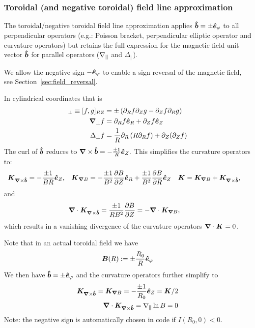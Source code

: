 \subsubsection{Toroidal (and negative toroidal) field line approximation}\label{sec:torfieldlineapprox}
The toroidal/negative toroidal field line approximation applies \(\bm{\hat{b}}= \pm \bm{\hat{e}}_\varphi\) to all perpendicular operators
(e.g.: Poisson bracket, perpendicular elliptic operator and curvature operators)
but retains the full expression for the magnetic field unit vector \(\bm{\hat{b}}\)
for parallel operators (\(\nabla_\parallel\) and \(\Delta_\parallel\)).
\begin{tcolorbox}[title=Note]
We allow the negative sign $-\bm{\hat{e}}_\varphi$ to enable a sign reversal of the magnetic field, see Section~\ref{sec:field_reversal}.
\end{tcolorbox}
In cylindrical coordinates that is
\begin{align}
[f,g]_\perp \equiv [f,g]_{RZ} &= \pm \left(\partial_R f\partial_Z g - \partial_Z f\partial_R g\right) \\
\np f &= \partial_R f \ehat_R + \partial_Z f \ehat_Z \\
\Delta_\perp f &= \frac{1}{R}\partial_R \left( R \partial_R f\right) + \partial_Z(\partial_Z f)
\label{}
\end{align}
The curl of $\bm{\hat{b}}$ reduces to
 ${\boldsymbol{\nabla}}\times\bm{\hat{b}} = -  \frac{\pm 1}{R} \bm{\hat{e}}_Z$.
This simplifies the curvature operators to:
\begin{align}
{\boldsymbol{{K}}}_{{{\boldsymbol{\nabla}}\times\bm{\hat{b}}}}  &=  -  \frac{\pm 1}{B R} \bm{\hat{e}}_Z , &
{\boldsymbol{ {K} }}_{{\boldsymbol{\nabla}}  B}  &=  -\frac{\pm 1}{B^2}\frac{\partial B}{\partial Z}\bm{\hat{e}}_R +\frac{\pm 1}{B^2} \frac{\partial B}{\partial R}\bm{\hat{e}}_Z &
{\boldsymbol{ {K} }} &= {{\boldsymbol{K}}_{{\boldsymbol{\nabla}} B}}  +{{\boldsymbol{K}}_{{\boldsymbol{\nabla}}\times\bm{\hat{b}}}} ,
\end{align}
and
\begin{align}
    {\boldsymbol{\nabla}}\cdot {{\boldsymbol{K}}_{{\boldsymbol{\nabla}}\times\bm{\hat{b}}}} &= \frac{\pm 1}{R B^2} \frac{\partial B}{\partial Z} = -{\boldsymbol{\nabla}}\cdot {{\boldsymbol{K}}_{{\boldsymbol{\nabla}}B}},
\end{align}
which results in a vanishing divergence of the curvature operators \( {\boldsymbol{\nabla}}\cdot {\boldsymbol{ {K} }} = 0\).

Note that in an actual toroidal field we have
\begin{align}
  {\boldsymbol{B}}(R) := \pm \frac{R_0}{R} \bm{\hat{e}}_\varphi
  \label{}
\end{align}
We then have $\bm{\hat{b}} = \pm\bm{\hat{e}}_\varphi$ and the curvature operators further
simplify to
\begin{align}
  {{\boldsymbol{K}}_{{\boldsymbol{\nabla}}\times\bm{\hat{b}}}} = {{\boldsymbol{K}}_{{\boldsymbol{\nabla}} B}} = -\frac{\pm 1}{R_0} \bm{\hat{e}}_Z =
{\boldsymbol{  K}}/2\\
  {\boldsymbol{\nabla}}\cdot{{\boldsymbol{K}}_{{\boldsymbol{\nabla}}\times\bm{\hat{b}}}}=
    \nabla_\parallel \ln B = 0
    \label{}
\end{align}
Note: the negative sign is automatically chosen in code if $I(R_0, 0)<0$.

